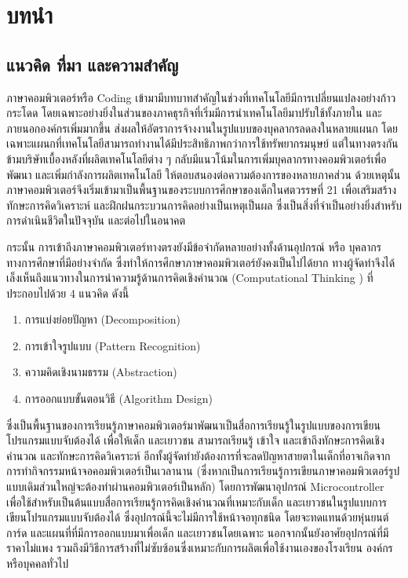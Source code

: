 \chapter{บทนำ}
\label{chapter:introduction}

\section{แนวคิด ที่มา และความสำคัญ}
ภาษาคอมพิวเตอร์หรือ Coding เข้ามามีบทบาทสำคัญในช่วงที่เทคโนโลยีมีการเปลี่ยนแปลงอย่างก้าวกระโดด โดยเฉพาะอย่างยิ่งในส่วนของภาคธุรกิจที่เริ่มมีการนำเทคโนโลยีมาปรับใช้ทั้งภายใน และภายนอกองค์กรเพิ่มมากขึ้น
ส่งผลให้อัตราการจ้างงานในรูปแบบของบุคลากรลดลงในหลายแผนก โดยเฉพาะแผนกที่เทคโนโลยีสามารถทำงานได้มีประสิทธิภาพกว่าการใช้ทรัพยากรมนุษย์ แต่ในทางตรงกันข้ามบริษัทเบื้องหลังที่ผลิตเทคโนโลยีต่าง ๆ
กลับมีแนวโน้มในการเพิ่มบุคลากรทางคอมพิวเตอร์เพื่อพัฒนา และเพิ่มกำลังการผลิตเทคโนโลยี ให้ตอบสนองต่อความต้องการของหลายภาคส่วน ด้วยเหตุนั้น ภาษาคอมพิวเตอร์จึงเริ่มเข้ามาเป็นพื้นฐานของระบบการศึกษาของเด็กในศตวรรษที่ 21
เพื่อเสริมสร้างทักษะการคิดวิเคราะห์ และฝึกฝนกระบวนการคิดอย่างเป็นเหตุเป็นผล ซึ่งเป็นสิ่งที่จำเป็นอย่างยิ่งสำหรับการดำเนินชีวิตในปัจจุบัน และต่อไปในอนาคต

กระนั้น การเข้าถึงภาษาคอมพิวเตอร์ทางตรงยังมีข้อจำกัดหลายอย่างทั้งด้านอุปกรณ์ หรือ บุคลากรทางการศึกษาที่มีอย่างจำกัด ซึ่งทำให้การศึกษาภาษาคอมพิวเตอร์ยังคงเป็นไปได้ยาก
ทางผู้จัดทำจึงได้เล็งเห็นถึงแนวทางในการนำความรู้ด้านการคิดเชิงคำนวณ \cite{KnowComputationalThinking} (Computational Thinking \cite{IntroductionToComputationalThinking}) ที่ประกอบไปด้วย 4 แนวคิด ดังนี้
\begin{enumerate}
    \item การแบ่งย่อยปัญหา (Decomposition)
    \item การเข้าใจรูปแบบ (Pattern Recognition)
    \item ความคิดเชิงนามธรรม (Abstraction)
    \item การออกแบบขั้นตอนวิธี (Algorithm Design)
\end{enumerate}
ซึ่งเป็นพื้นฐานของการเรียนรู้ภาษาคอมพิวเตอร์มาพัฒนาเป็นสื่อการเรียนรู้ในรูปแบบของการเขียนโปรแกรมแบบจับต้องได้ เพื่อให้เด็ก และเยาวชน สามารถเรียนรู้ เข้าใจ
และเข้าถึงทักษะการคิดเชิงคำนวณ และทักษะการคิดวิเคราะห์ อีกทั้งผู้จัดทำยังต้องการที่จะลดปัญหาสายตาในเด็กที่อาจเกิดจากการทำกิจกรรมหน้าจอคอมพิวเตอร์เป็นเวลานาน
(ซึ่งหากเป็นการเรียนรู้การเขียนภาษาคอมพิวเตอร์รูปแบบเดิมส่วนใหญ่จะต้องทำผ่านคอมพิวเตอร์เป็นหลัก) โดยการพัฒนาอุปกรณ์ Microcontroller
เพื่อใช้สำหรับเป็นต้นแบบสื่อการเรียนรู้การคิดเชิงคำนวณที่เหมาะกับเด็ก และเยาวชนในรูปแบบการเขียนโปรแกรมแบบจับต้องได้ ซึ่งอุปกรณ์นี้จะไม่มีการใช้หน้าจอทุกชนิด
โดยจะทดแทนด้วยหุ่นยนต์ การ์ด และแผนที่ที่มีการออกแบบมาเพื่อเด็ก และเยาวชนโดยเฉพาะ นอกจากนั้นยังอาศัยอุปกรณ์ที่มีราคาไม่แพง รวมถึงมีวิธีการสร้างที่ไม่ซับซ้อนซึ่งเหมาะกับการผลิตเพื่อใช้งานเองของโรงเรียน องค์กร หรือบุคคลทั่วไป

